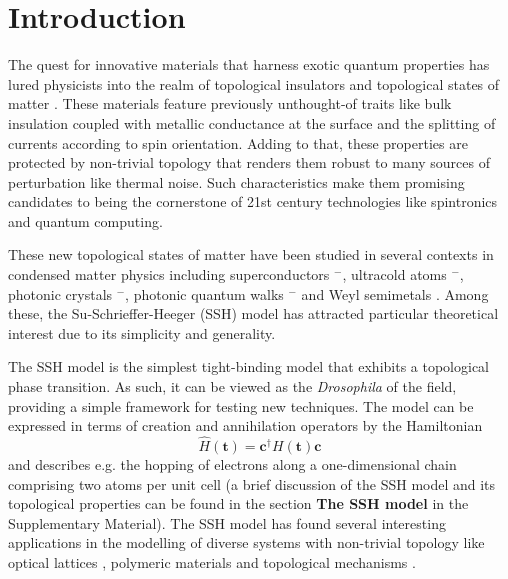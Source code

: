 \documentclass[10pt]{revtex4-1}
\begin{document}
\maketitle


\section{Introduction}
\label{introduction}
The quest for innovative materials that harness exotic quantum properties has lured physicists into the realm of topological insulators and topological states of matter \cite{RevModPhys.82.3045}. These materials feature previously unthought-of traits like bulk insulation coupled with metallic conductance at the surface and the splitting of currents according to spin orientation. Adding to that, these properties are protected by non-trivial topology that renders them robust to many sources of perturbation like thermal noise. Such characteristics make them promising candidates to being the cornerstone of 21st century technologies like spintronics and quantum computing.

These new topological states of matter have been studied in several contexts in condensed matter physics including superconductors \cite {CONTINENTINO2017A1}$^-$\cite{ryu2010topological}, ultracold atoms \cite{atala2013direct}$^-$\cite{meier2016observation}, photonic crystals \cite{hafezi2013imaging}$^-$\cite{PhysRevX.5.031011}, photonic quantum walks \cite{kitagawa2012observation}$^-$\cite{PhysRevX.7.031023} and Weyl semimetals \cite{soluyanov2015type,PhysRevX.5.031013}. Among these, the Su-Schrieffer-Heeger (SSH) model \cite{PhysRevLett.42.1698} has attracted particular theoretical interest due to its simplicity and generality.

The SSH model is the simplest tight-binding model that exhibits a topological phase transition. As such, it can be viewed as the \emph{Drosophila} of the field, providing a simple framework for testing new techniques. The model can be expressed in terms of creation and annihilation operators by the Hamiltonian
\begin{equation}
\label{SSH_ham}
\hat{H}(\mathbf{t})=\mathbf{c}^{\dagger}H(\mathbf{t})\mathbf{c}
\end{equation}
and describes e.g. the hopping of electrons along a one-dimensional chain comprising two atoms per unit cell (a brief discussion of the SSH model and its topological properties can be found in the section \textbf{The SSH model} in the Supplementary Material). The SSH model has found several interesting applications in the modelling of diverse systems with non-trivial topology like optical lattices \cite{maffei2018topological}, polymeric materials \cite{RevModPhys.73.681} and topological mechanisms \cite{kane2014topological,Chen13004}.
\end{document}
